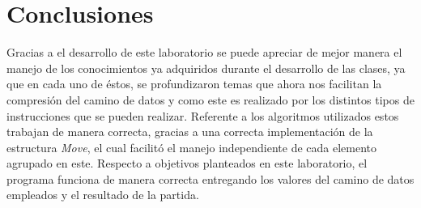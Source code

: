 \section{Conclusiones}

\noindent Gracias a el desarrollo de este laboratorio se puede apreciar de mejor manera el manejo de los conocimientos ya adquiridos durante el desarrollo de las clases, ya que en cada uno de éstos, se profundizaron temas que ahora nos facilitan la compresión del camino de datos y como este es realizado por los distintos tipos de instrucciones que se pueden realizar. Referente a los algoritmos utilizados estos trabajan de manera correcta, gracias a una correcta implementación de la estructura \textit{Move}, el cual facilitó el manejo independiente de cada elemento agrupado en este. Respecto a objetivos planteados en este laboratorio, el programa funciona de manera correcta entregando los valores del camino de datos empleados y el resultado de la partida.
